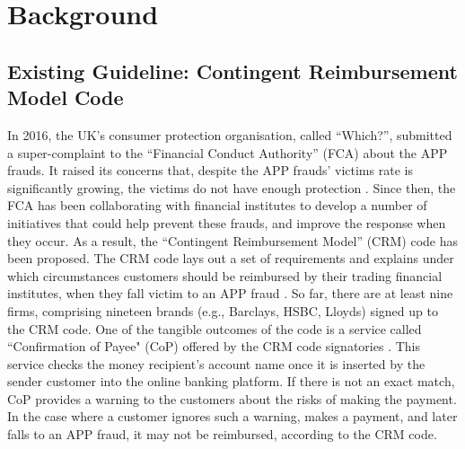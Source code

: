 
\section{Background}


\subsection{Existing Guideline: Contingent Reimbursement Model Code}

In  2016, the UK's consumer protection organisation, called ``Which?'', submitted a super-complaint to the ``Financial Conduct Authority'' (FCA) about the APP frauds. It raised its concerns that, despite the APP frauds' victims rate is significantly growing, the victims do not have enough protection \cite{Which?-super-complaint}.  Since then, the FCA has been collaborating with financial institutes  to develop a number of initiatives that
could help prevent these frauds, and improve the response when they  occur. As a result,  the ``Contingent Reimbursement Model'' (CRM) code has been proposed. The  CRM code  lays out a set of requirements and explains under which circumstances customers should be reimbursed by their trading financial institutes, when they fall victim to an APP fraud \cite{CRM-code}. So far,  there are at least nine firms, comprising nineteen brands (e.g., Barclays, HSBC,  Lloyds) signed up to the CRM code. One of the tangible outcomes of the code is a service called ``Confirmation of Payee" (CoP)  offered by the CRM code signatories \cite{CoP}. This service checks the money recipient's account name once it is inserted by the sender customer into the online banking platform. If there is not an exact match, CoP provides a warning to the  customers about the risks of making the payment. In the case where a customer ignores such a warning, makes a payment, and later falls to an APP fraud,  it may not be reimbursed, according to the CRM code.

